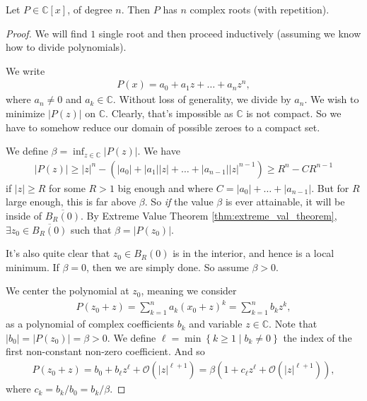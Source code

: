 \begin{theorem}\label{thm:algebra}
	Let $P \in \mathbb{C}[x]$, of degree $n$. Then $P$ has $n$ complex roots (with repetition).
\end{theorem}
\begin{proof}
	We will find $1$ single root and then proceed inductively (assuming we know how to divide polynomials).

	We write
	\begin{align*}
		P(x) = a_{0} + a_{1} z + \dots + a_{n} z^{n},
	\end{align*}
	where $a_{n} \neq 0$ and $a_{k} \in \mathbb{C}$. Without loss of generality, we divide by $a_{n}$. We wish to minimize $\left| P(z) \right|$ on $\mathbb{C}$. Clearly, that's impossible as $\mathbb{C}$ is not compact. So we have to somehow reduce our domain of possible zeroes to a compact set.

	We define $\beta = \inf_{z \in \mathbb{C}} \left| P(z) \right|$. We have
	\begin{align*}
		\left| P(z) \right| \geq \left| z \right|^{n} - (\left| a_{0} \right| + \left| a_{1} \right|\left| z \right| + \dots + \left| a_{n-1} \right|\left| z \right|^{n-1}) \geq R^{n} - C R^{n-1}
	\end{align*}
	if $\left| z \right| \geq R$ for some $R > 1$ big enough and where $C = \left| a_{0} \right| + \dots + \left| a_{n-1} \right|$. But for $R$ large enough, this is far above $\beta $. So \textit{if} the value $\beta $ is ever attainable, it will be inside of $\overline{ B_{R}(0)} $. By Extreme Value Theorem \ref{thm:extreme_val_theorem}, $\exists z_{0} \in \overline{ B_{R}(0) }$ such that $\beta = \left| P(z_{0}) \right|$.

	It's also quite clear that $z_{0} \in B_{R}(0)$ is in the interior, and hence is a local minimum. If $\beta = 0$, then we are simply done. So assume $\beta > 0$.

	We center the polynomial at $z_{0}$, meaning we consider
	\begin{align*}
		P(z_{0} + z) = \sum_{k=1}^{n} a_{k}(x_{0}+z)^{k} = \sum_{k=1}^{n} b_{k}z^{k},
	\end{align*}
	as a polynomial of complex coefficients $b_{k}$ and variable $z \in \mathbb{C}$. Note that $\left| b_{0} \right| = \left| P(z_{0}) \right| = \beta > 0$. We define $\ell = \min\left\{ k \geq 1 \mid b_{k} \neq 0 \right\}$ the index of the first non-constant non-zero coefficient. And so
	\begin{align*}
		P(z_{0} + z) = b_{0} + b_{\ell}z^{\ell} + \mathcal{O}(\left| z \right|^{\ell+1}) = \beta \left(1 + c_{\ell} z^{\ell} + \mathcal{O}(\left| z \right|^{\ell+1}) \right),
	\end{align*}
	where $c_{k} = b_{k} / b_{0} = b_{k} / \beta$.


\end{proof}

